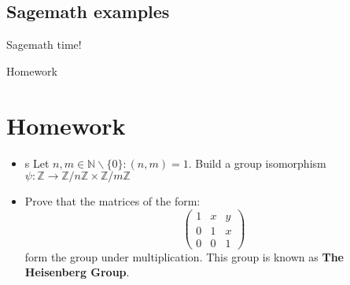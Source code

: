 \documentclass{beamer}
\begin{document}

\begin{frame}{}
	\section{Sagemath examples}
	\begin{center}
		Sagemath time!
	\end{center}
\end{frame}

\begin{frame}{Homework}
    \section{Homework}
	\begin{itemize}
		\item s
		Let $n, m \in \mathbb{N} \backslash \{0\} : (n, m) = 1$. \newline
		Build a group isomorphism 
		$\psi : \mathbb{Z} \to \mathbb{Z} / n \mathbb{Z} \times \mathbb{Z} / m \mathbb{Z}$
		\item Prove that the matrices of the form:
		$$\begin{pmatrix}
			1 & x & y \\
			0 & 1 & x \\
			0 & 0 & 1
		\end{pmatrix}$$ 
		form the group under multiplication. This group is known as 
		\textbf{The Heisenberg Group}.
	\end{itemize}
\end{frame}
\end{document}
